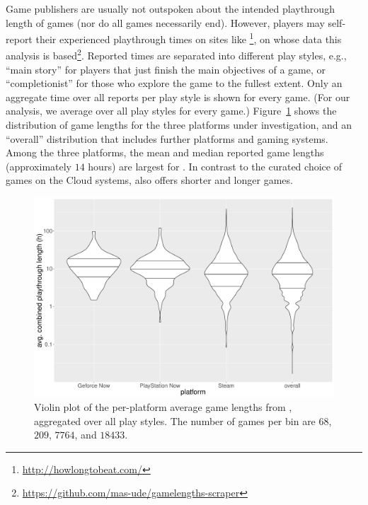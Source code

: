 Game publishers are usually not outspoken about the intended playthrough length of games (nor do all games necessarily end). However, players may self-report their experienced playthrough times on sites like \hltb\footnote{\url{http://howlongtobeat.com/}}, on whose data this analysis is based\footnote{\url{https://github.com/mas-ude/gamelengths-scraper}}. Reported times are separated into different play styles, e.g., ``main story'' for players that just finish the main objectives of a game, or ``completionist'' for those who explore the game to the fullest extent. Only an aggregate time over all reports per play style is shown for every game. (For our analysis, we average over all play styles for every game.) %
Figure~\ref{fig:gamelengths-violin} shows the distribution of game lengths for the three platforms under investigation, and an ``overall'' distribution that includes further platforms and gaming systems. Among the three platforms, the mean and median reported game lengths (approximately $14$ hours) are largest for \gfnow. In contrast to the curated choice of games on the Cloud systems, \steam also offers shorter and longer games.


\begin{figure}[!t]
	\centering
	\includegraphics[width=1.0\columnwidth]{images/gamelengths-by-platform-violin.pdf}
	\caption{Violin plot of the per-platform average game lengths from \hltb, aggregated over all play styles. The number of games per bin are $68$, $209$, $7764$, and $18433$.}
\label{fig:gamelengths-violin}
\end{figure}



